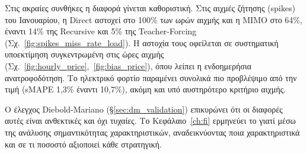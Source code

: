 Στις ακραίες συνθήκες η διαφορά γίνεται καθοριστική. Στις αιχμές ζήτησης (spikes) του
Ιανουαρίου, η Direct αστοχεί στο 100\% των ωρών αιχμής και η MIMO στο 64\%, έναντι 14\%
της Recursive και 5\% της Teacher-Forcing (Σχ.~\ref{fig:spikes_miss_rate_load}).
Η αστοχία τους οφείλεται σε συστηματική υποεκτίμηση συγκεντρωμένη στις
ώρες αιχμής (Σχ.~\ref{fig:hourly_price},~\ref{fig:bias_price}), όπου λείπει η ενδοημερήσια
ανατροφοδότηση. Το ηλεκτρικό φορτίο παραμένει συνολικά πιο προβλέψιμο από την τιμή
(sMAPE 1,3\% έναντι 10,7\%), ακόμη και υπό αυστηρότερο κριτήριο αιχμής.

Ο έλεγχος Diebold-Mariano (§\ref{sec:dm_validation}) επικυρώνει ότι οι διαφορές αυτές
είναι ανθεκτικές και όχι τυχαίες. Το Κεφάλαιο~\ref{ch:fi} ερμηνεύει το γιατί μέσω της
ανάλυσης σημαντικότητας χαρακτηριστικών, αναδεικνύοντας ποια χαρακτηριστικά και σε τι
ποσοστό αξιοποιεί κάθε στρατηγική.
